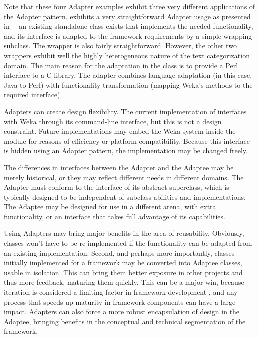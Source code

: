 Note that these four Adapter examples exhibit three very different
applications of the Adapter pattern.  
exhibits a very straightforward Adapter usage as presented in
\cite{gamma:95}---an existing standalone class exists that implements the
needed functionality, and its interface is adapted to the framework
requirements by a simple wrapping subclass.  The 
wrapper is also fairly straightforward.  However, the other two
wrappers exhibit well the highly heterogeneous nature of the text
categorization domain.  The main reason for the adaptation in the
 class is to provide a Perl interface to a C
library.  The  adapter combines language
adaptation (in this case, Java to Perl) with functionality
transformation (mapping Weka's methods to the required 
interface).

Adapters can create design flexibility.
The current implementation of  interfaces with
Weka through its command-line interface, but this is not a design
constraint.  Future implementations may embed the Weka system inside
the  module for reasons of efficiency or platform
compatibility.  Because this interface is hidden using an Adapter
pattern, the implementation may be changed freely.

The differences in interfaces between the Adapter and the Adaptee may
be merely historical, or they may reflect different needs in different
domains.  The Adapter must conform to the interface of its abstract
superclass, which is typically designed to be independent of subclass
abilities and implementations.  The Adaptee may be designed for use in
a different arena, with extra functionality, or an interface that
takes full advantage of its capabilities.

Using Adapters may bring major benefits in the area of reusability.
Obviously, classes won't have to be re-implemented if the
functionality can be adapted from an existing implementation.  Second,
and perhaps more importantly, classes initially implemented for a
framework may be converted into Adaptee classes, usable in isolation.
This can bring them better exposure in other projects and thus more
feedback, maturing them quickly.  This can be a major win, because
iteration is considered a limiting factor in framework development
\cite[p. 75]{fayad:99}, and any process that speeds up maturity in
framework components can have a large impact.  Adapters can also force
a more robust encapsulation of design in the Adaptee, bringing
benefits in the conceptual and technical segmentation of the
framework.

